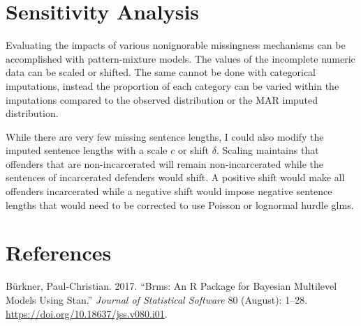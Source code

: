 \documentclass[
  letterpaper,
  DIV=11,
  numbers=noendperiod]{scrartcl}
\newlength{\cslhangindent}
\newlength{\cslentryspacingunit} %
\newenvironment{CSLReferences}[2] %
 {%
  \setlength{\parindent}{0pt}
  \ifodd #1
  \let\oldpar\par
  \def\par{\hangindent=\cslhangindent\oldpar}
  \fi
  \setlength{\parskip}{#2\cslentryspacingunit}
 }%
 {}
\begin{document}
\hypertarget{sensitivity-analysis}{%
\section{Sensitivity Analysis}\label{sensitivity-analysis}}

Evaluating the impacts of various nonignorable missingness mechanisms
can be accomplished with pattern-mixture models. The values of the
incomplete numeric data can be scaled or shifted. The same cannot be
done with categorical imputations, instead the proportion of each
category can be varied within the imputations compared to the observed
distribution or the MAR imputed distribution.

While there are very few missing sentence lengths, I could also modify
the imputed sentence lengths with a scale \(c\) or shift \(\delta\).
Scaling maintains that offenders that are non-incarcerated will remain
non-incarcerated while the sentences of incarcerated defenders would
shift. A positive shift would make all offenders incarcerated while a
negative shift would impose negative sentence lengths that would need to
be corrected to use Poisson or lognormal hurdle glms.

\newpage

\hypertarget{references}{%
\section*{References}\label{references}}

\hypertarget{refs}{}
\begin{CSLReferences}{1}{0}
\leavevmode{}%
Bürkner, Paul-Christian. 2017. {``Brms: An R Package for Bayesian
Multilevel Models Using Stan.''} \emph{Journal of Statistical Software}
80 (August): 1--28. \url{https://doi.org/10.18637/jss.v080.i01}.

\end{CSLReferences}
\end{document}
